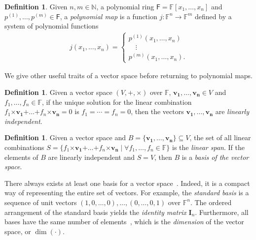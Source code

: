 \documentclass[draft, 12pt, a4paper, oneside]{memoir}
\theoremstyle{definition}
\newtheorem{definition}[theorem]{Definition}
\begin{document}
\begin{definition}\label{def:polymap}
  Given $n, m \in \mathbb{N}$, a polynomial ring $\mathsf{F} = \mathbb{F}[x_{1}, \dots, x_{n}]$ and $p^{(1)}, \dots, p^{(m)} \in \mathsf{F}$, a \emph{polynomial map} is a function $j : \mathbb{F}^{n} \to \mathbb{F}^{m}$ defined by a system of polynomial functions
  \begin{align*}
    j(x_{1}, \dots, x_{n}) =
    \begin{cases}
      p^{(1)}(x_{1}, \dots, x_{n}) \\
      \quad \vdots \\
      p^{(m)}(x_{1}, \dots, x_{n}).
    \end{cases}
  \end{align*}
\end{definition}

We give other useful traits of a vector space before returning to polynomial maps.

\begin{definition}
  Given a vector space $(V, \bm{+}, \bm{\times})$ over $\mathbb{F}$, $\mathbf{v_{1}}, \dots, \mathbf{v_{n}} \in V$ and $f_{1}, \dots, f_{n} \in \mathbb{F}$, if the unique solution for the linear combination $f_{1} \bm{\times} \mathbf{v_{1}} \bm{+} \dots \bm{+} f_{n} \bm{\times} \mathbf{v_{n}} = 0$ is $f_{1} = \cdots = f_{n} = 0$, then the vectors $\mathbf{v_{1}}, \dots, \mathbf{v_{n}}$ are \emph{linearly independent}.
\end{definition}

\begin{definition}
  Given a vector space and $B = \{\mathbf{v_{1}}, \dots, \mathbf{v_{n}}\} \subseteq V$, the set of all linear combinations $S = \{ f_{1} \bm{\times} \mathbf{v_{1}} \bm{+} \dots \bm{+} f_{n} \bm{\times} \mathbf{v_{n}} \mid \forall f_{1}, \dots, f_{n} \in \mathbb{F} \}$ is the \emph{linear span}. If the elements of $B$ are linearly independent and $S = V$, then $B$ is a \emph{basis of the vector space}.
\end{definition}

There always exists at least one basis for a vector space~\cite[p. 409, Prop. 1]{Dummit:2003}. Indeed, it is a compact way of representing the entire set of vectors. For example, the \emph{standard basis} is a sequence of unit vectors $(1, 0, \dots, 0), \dots, (0, \dots, 0, 1)$ over $\mathbb{F}^{n}$. The ordered arrangement of the standard basis yields the \emph{identity matrix} $\mathbf{I}_{n}$. Furthermore, all bases have the same number of elements~\cite[p. 411, Cor. 4]{Dummit:2003}, which is the \emph{dimension} of the vector space, or $\dim(\cdot)$. 
\end{document}
